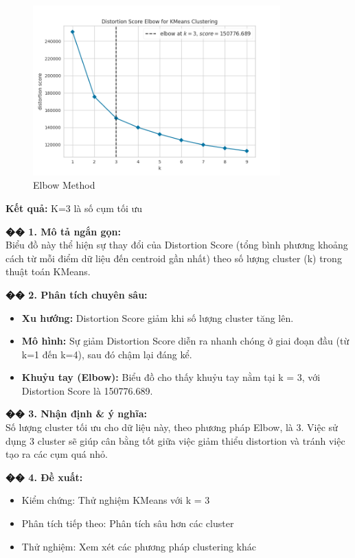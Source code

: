 \documentclass[12pt,a4paper]{article}
\begin{document}
\begin{figure}[H]
\centering
\includegraphics[width=0.85\textwidth]{results_comb_PM25_Hanoi_2018_sm_20251011_121424/20251011_121424_ml_elbow_method.png}
\caption{Elbow Method}
\end{figure}

\begin{aibox}
\textbf{Kết quả:} K=3 là số cụm tối ưu

\textbf{�� 1. Mô tả ngắn gọn:}\\
Biểu đồ này thể hiện sự thay đổi của Distortion Score (tổng bình phương khoảng cách từ mỗi điểm dữ liệu đến centroid gần nhất) theo số lượng cluster (k) trong thuật toán KMeans.

\textbf{�� 2. Phân tích chuyên sâu:}
\begin{itemize}
    \item \textbf{Xu hướng:} Distortion Score giảm khi số lượng cluster tăng lên.
    \item \textbf{Mô hình:} Sự giảm Distortion Score diễn ra nhanh chóng ở giai đoạn đầu (từ k=1 đến k=4), sau đó chậm lại đáng kể.
    \item \textbf{Khuỷu tay (Elbow):} Biểu đồ cho thấy khuỷu tay nằm tại k = 3, với Distortion Score là 150776.689.
\end{itemize}

\textbf{�� 3. Nhận định \& ý nghĩa:}\\
Số lượng cluster tối ưu cho dữ liệu này, theo phương pháp Elbow, là 3. Việc sử dụng 3 cluster sẽ giúp cân bằng tốt giữa việc giảm thiểu distortion và tránh việc tạo ra các cụm quá nhỏ.

\textbf{�� 4. Đề xuất:}
\begin{itemize}
    \item Kiểm chứng: Thử nghiệm KMeans với k = 3
    \item Phân tích tiếp theo: Phân tích sâu hơn các cluster
    \item Thử nghiệm: Xem xét các phương pháp clustering khác
\end{itemize}
\end{aibox}
\end{document}
